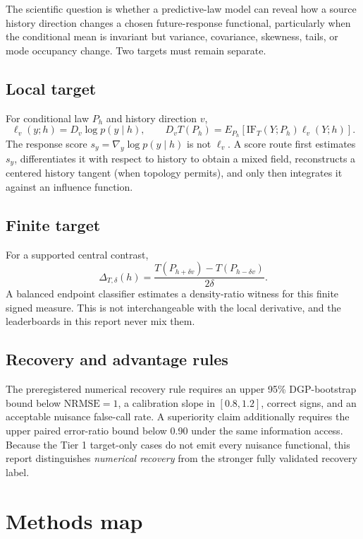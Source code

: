 \documentclass[11pt]{article}
\newcommand{\NRMSE}{\mathrm{NRMSE}}
\newcommand{\localtarget}{D_vT(P_h)}
\newcommand{\finitetarget}{\Delta_{T,\delta}(h)}
\begin{document}
The scientific question is whether a predictive-law model can reveal how a source
history direction changes a chosen future-response functional, particularly when
the conditional mean is invariant but variance, covariance, skewness, tails, or
mode occupancy change.  Two targets must remain separate.

\subsection{Local target}

For conditional law $P_h$ and history direction $v$,
\[
  \ell_v(y;h)=D_v\log p(y\mid h),\qquad
  \localtarget = E_{P_h}\!\left[\mathrm{IF}_T(Y;P_h)\ell_v(Y;h)\right].
\]
The response score $s_y=\nabla_y\log p(y\mid h)$ is not $\ell_v$.  A score route
first estimates $s_y$, differentiates it with respect to history to obtain a mixed
field, reconstructs a centered history tangent (when topology permits), and only
then integrates it against an influence function.

\subsection{Finite target}

For a supported central contrast,
\[
  \finitetarget = \frac{T(P_{h+\delta v})-T(P_{h-\delta v})}{2\delta}.
\]
A balanced endpoint classifier estimates a density-ratio witness for this finite
signed measure.  This is not interchangeable with the local derivative, and the
leaderboards in this report never mix them.

\subsection{Recovery and advantage rules}

The preregistered numerical recovery rule requires an upper 95\% DGP-bootstrap
bound below $\NRMSE=1$, a calibration slope in $[0.8,1.2]$, correct signs, and an
acceptable nuisance false-call rate.  A superiority claim additionally requires
the upper paired error-ratio bound below 0.90 under the same information access.
Because the Tier 1 target-only cases do not emit every nuisance functional, this
report distinguishes \emph{numerical recovery} from the stronger fully validated
recovery label.

\section{Methods map}
\end{document}

